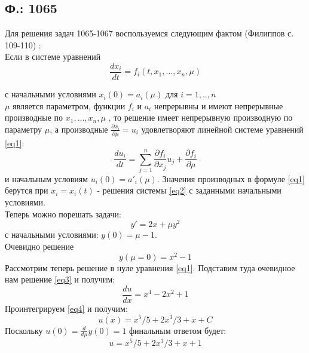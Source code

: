 \documentclass{article}
\begin{document}
\subsection{Ф.: 1065}
Для решения задач 1065-1067 воспользуемся следующим фактом (Филиппов с. 109-110) :\\
Если в системе уравнений 
\begin{equation}
\label{eq2}
    \frac{d x_i}{d t} = f_i(t,x_1, ... , x_n, \mu) 
\end{equation}

с начальными условиями $x_i(0)=a_i(\mu)$ для $i=1,..,n$ \\
$\mu$ является параметром, функции $f_i$ и $a_i$ непрерывны и имеют непрерывные производные по $x_1, ... , x_n, \mu$ , то решение имеет непрерывную производную по параметру $\mu$, а производные $\frac{\partial x_i}{\partial \mu} = u_i$ удовлетворяют линейной системе уравнений \ref{eq1}:
\begin{equation}
\label{eq1}
    \frac{d u_i}{d t} = \sum_{j=1}^n \frac{\partial f_i}{\partial x_j} u_j + \frac{\partial f_i}{\partial \mu}
\end{equation}
и начальным условиям $u_i(0)=a'_i(\mu)$. Значения производных в формуле \ref{eq1} берутся при $x_i=x_i(t)$ - решения системы \ref{eq2} с заданными начальными условиями.\\

Теперь можно порешать задачи:
\begin{equation}
    y'=2x+\mu y^2
\end{equation}
с начальными условиями: $y(0)=\mu-1$. \\
Очевидно решение 
\begin{equation} \label{eq3}
    y(\mu=0)=x^2-1
\end{equation} 
Рассмотрим теперь решение в нуле уравнения \ref{eq1}. Подставим туда очевидное нам решение \ref{eq3} и получим:
\begin{equation} \label{eq4}
    \frac{d u}{d x} = x^4 - 2x^2 +1
\end{equation}
Проинтегрируем \ref{eq4} и получим:
\begin{equation}
    u(x)=x^5/5+2 x^3 /3 + x + C
\end{equation}
Поскольку $u(0)=\frac{d }{d \mu} y(0)=1$ финальным ответом будет:\\
\begin{equation}
    u=x^5/5+2 x^3 /3 + x + 1
\end{equation}
\end{document}
